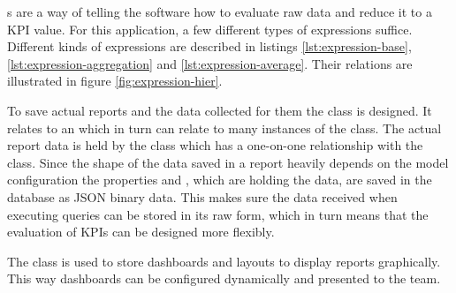 s are a way of telling the software how to evaluate raw data and reduce it to a KPI value. For this application, a few different types of expressions suffice. Different kinds of expressions are described in listings \ref{lst:expression-base}, \ref{lst:expression-aggregation} and \ref{lst:expression-average}. Their relations are illustrated in figure \ref{fig:expression-hier}.

To save actual reports and the data collected for them the  class is designed. It relates to an  which in turn can relate to many instances of the  class. The actual report data is held by the class  which has a one-on-one relationship with the  class. Since the shape of the data saved in a report heavily depends on the model configuration the properties  and , which are holding the data, are saved in the database as JSON binary data. This makes sure the data received when executing queries can be stored in its raw form, which in turn means that the evaluation of KPIs can be designed more flexibly. 

The class  is used to store dashboards and layouts to display reports graphically. This way dashboards can be configured dynamically and presented to the team.



